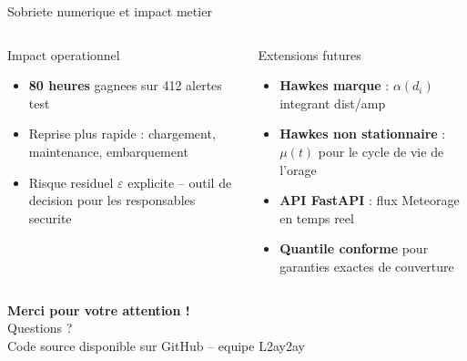 \documentclass[aspectratio=169, 10pt]{beamer}
\begin{document}
\begin{frame}{Sobriete numerique et impact metier}
\begin{columns}[T]
      \begin{block}{Impact operationnel}
        \begin{itemize}
          \item \textbf{80 heures} gagnees sur 412 alertes test
          \item Reprise plus rapide : chargement, maintenance, embarquement
          \item Risque residuel $\varepsilon$ explicite -- outil de decision pour les responsables securite
        \end{itemize}
      \end{block}
      \vspace{0.2cm}
      \begin{block}{Extensions futures}
        \begin{itemize}
          \item \textbf{Hawkes marque} : $\alpha(d_i)$ integrant dist/amp
          \item \textbf{Hawkes non stationnaire} : $\mu(t)$ pour le cycle de vie de l'orage
          \item \textbf{API FastAPI} : flux Meteorage en temps reel
          \item \textbf{Quantile conforme} pour garanties exactes de couverture
        \end{itemize}
      \end{block}
  \end{columns}
\end{frame}

\begin{frame}[plain]
  \vspace{1.4cm}
  \begin{center}
    {\Large \textbf{Merci pour votre attention !}}\\[0.7cm]
    {\large Questions ?}\\[0.8cm]
    \small Code source disponible sur GitHub -- equipe L2ay2ay
  \end{center}
\end{frame}
\end{document}
